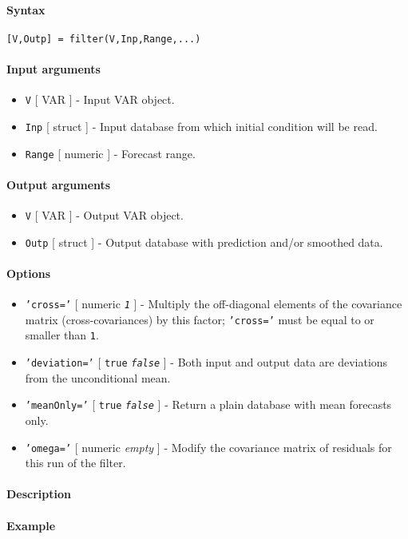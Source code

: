 


	\paragraph{Syntax}

\begin{verbatim}
[V,Outp] = filter(V,Inp,Range,...)
\end{verbatim}

\paragraph{Input arguments}

\begin{itemize}
\item
  \texttt{V} {[} VAR {]} - Input VAR object.
\item
  \texttt{Inp} {[} struct {]} - Input database from which initial
  condition will be read.
\item
  \texttt{Range} {[} numeric {]} - Forecast range.
\end{itemize}

\paragraph{Output arguments}

\begin{itemize}
\item
  \texttt{V} {[} VAR {]} - Output VAR object.
\item
  \texttt{Outp} {[} struct {]} - Output database with prediction and/or
  smoothed data.
\end{itemize}

\paragraph{Options}

\begin{itemize}
\item
  \texttt{'cross='} {[} numeric \textbar{} \emph{\texttt{1}} {]} -
  Multiply the off-diagonal elements of the covariance matrix
  (cross-covariances) by this factor; \texttt{'cross='} must be equal to
  or smaller than \texttt{1}.
\item
  \texttt{'deviation='} {[} \texttt{true} \textbar{}
  \emph{\texttt{false}} {]} - Both input and output data are deviations
  from the unconditional mean.
\item
  \texttt{'meanOnly='} {[} \texttt{true} \textbar{}
  \emph{\texttt{false}} {]} - Return a plain database with mean
  forecasts only.
\item
  \texttt{'omega='} {[} numeric \textbar{} \emph{empty} {]} - Modify the
  covariance matrix of residuals for this run of the filter.
\end{itemize}

\paragraph{Description}

\paragraph{Example}


